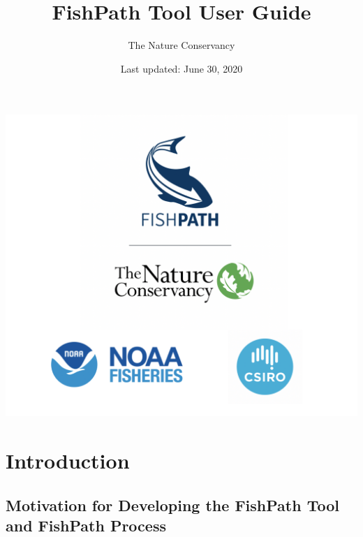 \documentclass[
  11pt,
]{book}
\title{FishPath Tool User Guide}
\author{The Nature Conservancy}
\date{Last updated: June 30, 2020}
\begin{document}
\maketitle

{
\setcounter{tocdepth}{1}
\tableofcontents
}
\hypertarget{section}{%
\chapter*{}\label{section}}

\begin{center}\includegraphics[width=0.75\linewidth]{images/3-logos} \end{center}

\hypertarget{intro}{%
\chapter{Introduction}\label{intro}}

\hypertarget{motivation}{%
\section{Motivation for Developing the FishPath Tool and FishPath Process}\label{motivation}}
\end{document}
